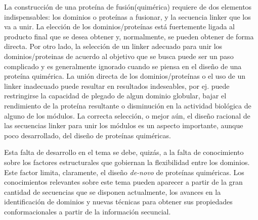 La construcción de una proteína de fusión(quimérica) requiere de dos elementos indispensables: 
los dominios o proteínas a fusionar, y la secuencia linker que los va a unir.
La elección de los dominios/proteínas está fuertemente ligada al producto final que se desea obtener y, normalmente, se pueden obtener de forma directa.
Por otro lado, la selección de un linker adecuado para unir los dominios/proteinas de acuerdo al objetivo que se busca puede ser un paso complicado y es generalmente ignorado cuando se piensa en el diseño de una proteína quimérica.
La unión directa de los dominios/proteínas o el uso de un linker inadecuado puede resultar en resultados indeseables, por ej. puede restringirse la capacidad de plegado de algun dominio globular, bajar el rendimiento de la proteína resultante o
disminución en la actividad biológica de alguno de los módulos.
La correcta selección, o mejor aún, el diseño racional de las secuencias linker para unir los módulos es un aspecto importante, aunque poco desarrollado, del diseño de proteínas quiméricas. 

Esta falta de desarrollo en el tema se debe, quizás, a la falta de conocimiento sobre los factores estructurales que gobiernan la flexibilidad entre los dominios.
Este factor limita, claramente, el diseño \textit{de-novo} de proteínas quiméricas. Los conocimientos relevantes sobre este tema pueden aparecer a partir de la gran cantidad de secuencias que se disponen actualmente, los avances en 
la identificación de dominios y nuevas técnicas para obtener sus propiedades conformacionales a partir de la información secuncial.


